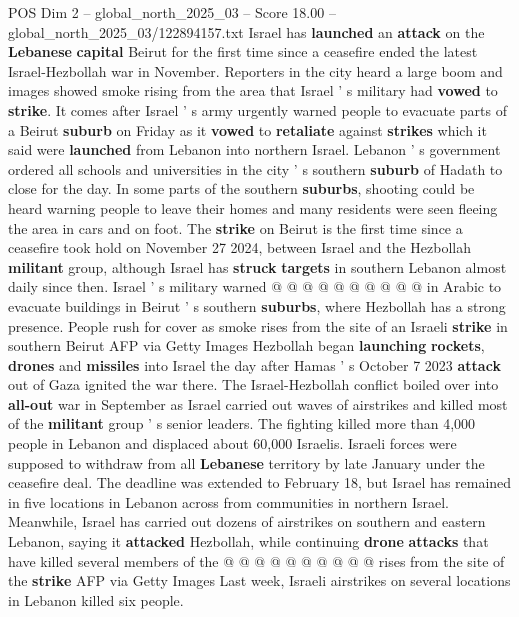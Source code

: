 \begin{textsample}{POS Dim 2 – global\_north\_2025\_03 – Score 18.00 – global\_north\_2025\_03/122894157.txt}  \label{ex:f2_pos_415}
Israel has \textbf{launched} an \textbf{attack} on the \textbf{Lebanese} \textbf{capital} Beirut for the first time since a ceasefire ended the latest Israel-Hezbollah war in November.
Reporters in the city heard a large boom and images showed smoke rising from the area that Israel ' s military had \textbf{vowed} to \textbf{strike}.
It comes after Israel ' s army urgently warned people to evacuate parts of a Beirut \textbf{suburb} on Friday as it \textbf{vowed} to \textbf{retaliate} against \textbf{strikes} which it said were \textbf{launched} from Lebanon into northern Israel.
Lebanon ' s government ordered all schools and universities in the city ' s southern \textbf{suburb} of Hadath to close for the day.
In some parts of the southern \textbf{suburbs}, shooting could be heard warning people to leave their homes and many residents were seen fleeing the area in cars and on foot.
The \textbf{strike} on Beirut is the first time since a ceasefire took hold on November 27 2024, between Israel and the Hezbollah \textbf{militant} group, although Israel has \textbf{struck} \textbf{targets} in southern Lebanon almost daily since then.
Israel ' s military warned @ @ @ @ @ @ @ @ @ @ in Arabic to evacuate buildings in Beirut ' s southern \textbf{suburbs}, where Hezbollah has a strong presence.
People rush for cover as smoke rises from the site of an Israeli \textbf{strike} in southern Beirut AFP via Getty Images Hezbollah began \textbf{launching} \textbf{rockets}, \textbf{drones} and \textbf{missiles} into Israel the day after Hamas ' s October 7 2023 \textbf{attack} out of Gaza ignited the war there.
The Israel-Hezbollah conflict boiled over into \textbf{all-out} war in September as Israel carried out waves of airstrikes and killed most of the \textbf{militant} group ' s senior leaders.
The fighting killed more than 4,000 people in Lebanon and displaced about 60,000 Israelis.
Israeli forces were supposed to withdraw from all \textbf{Lebanese} territory by late January under the ceasefire deal.
The deadline was extended to February 18, but Israel has remained in five locations in Lebanon across from communities in northern Israel.
Meanwhile, Israel has carried out dozens of airstrikes on southern and eastern Lebanon, saying it \textbf{attacked} Hezbollah, while continuing \textbf{drone} \textbf{attacks} that have killed several members of the @ @ @ @ @ @ @ @ @ @ rises from the site of the \textbf{strike} AFP via Getty Images Last week, Israeli airstrikes on several locations in Lebanon killed six people.

\end{textsample}
